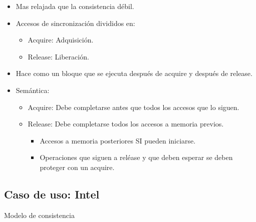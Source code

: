 \documentclass[12pt, twoside, openright]{report} %
\begin{document}
    \begin{itemize}
    
    \item
      Mas relajada que la consistencia débil.
    \item
      Accesos de sincronización divididos en:

      \begin{itemize}
      
      \item
        Acquire: Adquisición.
      \item
        Release: Liberación.
      \end{itemize}
    \item
      Hace como un bloque que se ejecuta después de acquire y después
      de release.
    \item
      Semántica:

      \begin{itemize}
      
      \item
        Acquire: Debe completarse antes que todos los accesos que lo
        siguen.
      \item
        Release: Debe completarse todos los accesos a memoria previos.

        \begin{itemize}
        
        \item
          Accesos a memoria posteriores SI pueden iniciarse.
        \item
          Operaciones que siguen a reléase y que deben esperar se
          deben proteger con un acquire.
        \end{itemize}
      \end{itemize}
    \end{itemize}
\pagebreak
\subsection{Caso de uso: Intel}


    Modelo de consistencia
\end{document}
